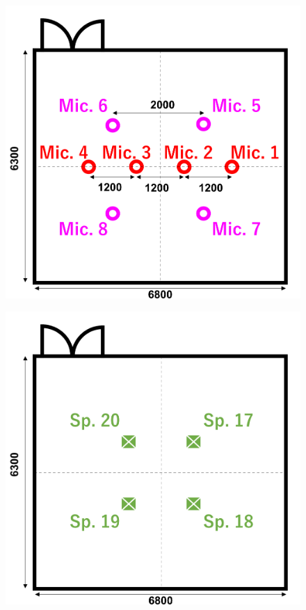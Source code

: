\documentclass[11pt,a4j]{jreport}
\begin{document}
\begin{figure}[H]
      \begin{minipage}[b]{0.5\linewidth}
          \centering
          \includegraphics[width=.9\linewidth]{images/afcEquipArrayMic.png}
          \label{fig:マイクロホン配置}
      \end{minipage}%
      \begin{minipage}[b]{0.5\linewidth}
        \centering
        \includegraphics[width=.9\linewidth]{images/afcEquipArraySp3.png}
        \label{fig:スピーカー配置 三層目}
        \vfill
      \end{minipage}
  

\end{figure}
\end{document}
